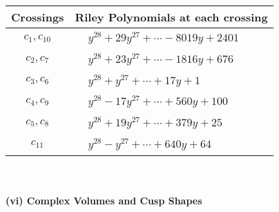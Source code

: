 \documentclass[1p]{elsarticle_modified}
\theoremstyle{definition}
\begin{document}
\begin{tabular}{m{50pt}|m{274pt}}
Crossings & \hspace{64pt}Riley Polynomials at each crossing \\
\hline $$\begin{aligned}c_{1},c_{10}\end{aligned}$$&$\begin{aligned}
&y^{28}+29 y^{27}+\cdots-8019 y+2401
\end{aligned}$\\
\hline $$\begin{aligned}c_{2},c_{7}\end{aligned}$$&$\begin{aligned}
&y^{28}+23 y^{27}+\cdots-1816 y+676
\end{aligned}$\\
\hline $$\begin{aligned}c_{3},c_{6}\end{aligned}$$&$\begin{aligned}
&y^{28}+y^{27}+\cdots+17 y+1
\end{aligned}$\\
\hline $$\begin{aligned}c_{4},c_{9}\end{aligned}$$&$\begin{aligned}
&y^{28}-17 y^{27}+\cdots+560 y+100
\end{aligned}$\\
\hline $$\begin{aligned}c_{5},c_{8}\end{aligned}$$&$\begin{aligned}
&y^{28}+19 y^{27}+\cdots+379 y+25
\end{aligned}$\\
\hline $$\begin{aligned}c_{11}\end{aligned}$$&$\begin{aligned}
&y^{28}- y^{27}+\cdots+640 y+64
\end{aligned}$\\
\hline
\end{tabular}\\~\\
\newpage\flushleft \textbf{(vi) Complex Volumes and Cusp Shapes}
\end{document}
